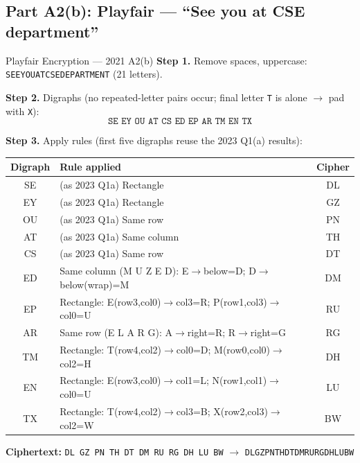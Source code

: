 \documentclass[12pt,a4paper]{article}
\begin{document}
\subsection{Part A2(b): Playfair --- ``See you at CSE department''}
\begin{solbox}{Playfair Encryption --- 2021 A2(b)}
\textbf{Step 1.} Remove spaces, uppercase: \texttt{SEEYOUATCSEDEPARTMENT} (21 letters).

\textbf{Step 2.} Digraphs (no repeated-letter pairs occur; final letter \texttt{T} is alone $\to$ pad with \texttt{X}):
\[ \texttt{SE\ EY\ OU\ AT\ CS\ ED\ EP\ AR\ TM\ EN\ TX} \]

\textbf{Step 3.} Apply rules (first five digraphs reuse the 2023 Q1(a) results):
\begin{center}
\renewcommand{\arraystretch}{1.3}
\begin{tabular}{c|l|c}
\toprule
Digraph & Rule applied & Cipher \\
\midrule
SE & (as 2023 Q1a) Rectangle & DL \\
EY & (as 2023 Q1a) Rectangle & GZ \\
OU & (as 2023 Q1a) Same row & PN \\
AT & (as 2023 Q1a) Same column & TH \\
CS & (as 2023 Q1a) Same row & DT \\
ED & Same column (M U Z E D): E$\to$below=D; D$\to$below(wrap)=M & DM \\
EP & Rectangle: E(row3,col0)$\to$col3=R; P(row1,col3)$\to$col0=U & RU \\
AR & Same row (E L A R G): A$\to$right=R; R$\to$right=G & RG \\
TM & Rectangle: T(row4,col2)$\to$col0=D; M(row0,col0)$\to$col2=H & DH \\
EN & Rectangle: E(row3,col0)$\to$col1=L; N(row1,col1)$\to$col0=U & LU \\
TX & Rectangle: T(row4,col2)$\to$col3=B; X(row2,col3)$\to$col2=W & BW \\
\bottomrule
\end{tabular}
\end{center}

\textbf{Ciphertext:} \texttt{DL GZ PN TH DT DM RU RG DH LU BW} $\to$ \texttt{DLGZPNTHDTDMRURGDHLUBW}
\end{solbox}
\end{document}

